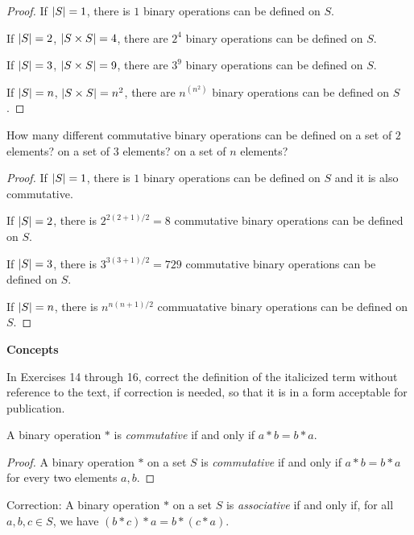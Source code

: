 \begin{proof}
    If $\left\vert{S}\right\vert = 1$, there is $1$ binary operations can be defined on $S$.

    If $\left\vert{S}\right\vert = 2$, $\left\vert{S\times S}\right\vert = 4$, there are $2^{4}$ binary operations can be defined on $S$.

    If $\left\vert{S}\right\vert = 3$, $\left\vert{S\times S}\right\vert = 9$, there are $3^{9}$ binary operations can be defined on $S$.

    If $\left\vert{S}\right\vert = n$, $\left\vert{S\times S}\right\vert = n^{2}$, there are $n^{(n^{2})}$ binary operations can be defined on $S$.
\end{proof}

\begin{exercise}
    How many different commutative binary operations can be defined on a set of $2$ elements? on a set of $3$ elements? on a set of $n$ elements?
\end{exercise}

\begin{proof}
    If $\left\vert{S}\right\vert = 1$, there is $1$ binary operations can be defined on $S$ and it is also commutative.

    If $\left\vert{S}\right\vert = 2$, there is $2^{2(2+1)/2} = 8$ commutative binary operations can be defined on $S$.

    If $\left\vert{S}\right\vert = 3$, there is $3^{3(3+1)/2} = 729$ commutative binary operations can be defined on $S$.

    If $\left\vert{S}\right\vert = n$, there is $n^{n(n+1)/2}$ commuatative binary operations can be defined on $S$.
\end{proof}

\textbf{Concepts}

In Exercises 14 through 16, correct the definition of the italicized term without reference to the text, if correction is needed, so that it is in a form acceptable for publication.

\begin{exercise}
    A binary operation $*$ is \textit{commutative} if and only if $a * b = b * a$.
\end{exercise}

\begin{proof}
    A binary operation $*$ on a set $S$ is \textit{commutative} if and only if $a * b = b * a$ for every two elements $a, b$.
\end{proof}

\begin{exercise}
    Correction: A binary operation $*$ on a set $S$ is \textit{associative} if and only if, for all $a, b, c\in S$, we have $(b * c) * a = b * (c * a)$.
\end{exercise}

